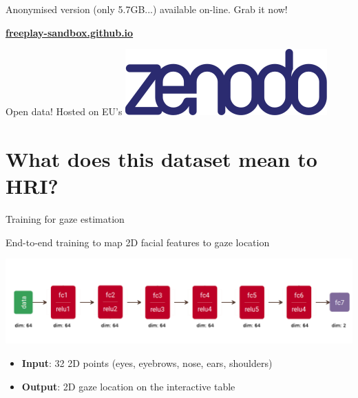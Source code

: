 \documentclass[compress]{beamer}
\begin{document}
\begin{frame}[plain]
    \Large
    \begin{center}
        Anonymised version (only 5.7GB...) available on-line. Grab it now!

        \LARGE \href{https://freeplay-sandbox.github.io}{\bf freeplay-sandbox.github.io}

        \vspace{3cm}
            \large Open data! Hosted on EU's  \includegraphics[width=0.3\linewidth]{zenodo}
    \end{center}
\end{frame}








\section[For HRI?]{What does this dataset mean to HRI?}


\begin{frame}{Training for gaze estimation}

    \Large End-to-end training to map 2D facial features to gaze location

    \begin{center}
        \includegraphics[width=0.9\linewidth]{nn-gaze-estimation}
    \end{center}

    \begin{itemize}
        \item \textbf{Input}: 32 2D points (eyes, eyebrows, nose, ears,
            shoulders)
        \item \textbf{Output}: 2D gaze location on the interactive table
    \end{itemize}
\end{frame}
\end{document}
